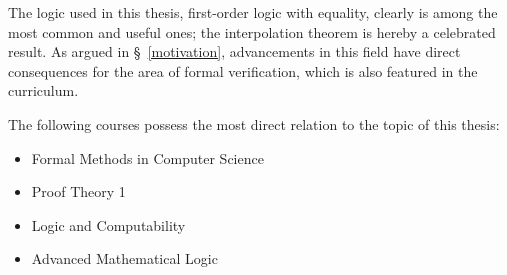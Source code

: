 \documentclass[,%
			paper=a4,%
			DIV11, %
			liststotoc,
			bibtotoc,
			draft=false,%
			numbers=noendperiod
			]{scrartcl}
\theoremstyle{definition}
\begin{document}
The logic used in this thesis, first-order logic with equality, clearly is among the most common and useful ones; the interpolation theorem is hereby a celebrated result.
As argued in \S~\ref{motivation}, advancements in this field have direct consequences for the area of formal verification, which is also featured in the curriculum.

The following courses possess the most direct relation to the topic of this thesis: 
\begin{itemize}
	\item Formal Methods in Computer Science
	\item Proof Theory 1 
	\item Logic and Computability 
	\item Advanced Mathematical Logic 
\end{itemize}


\nocite{*} %


\end{document}
